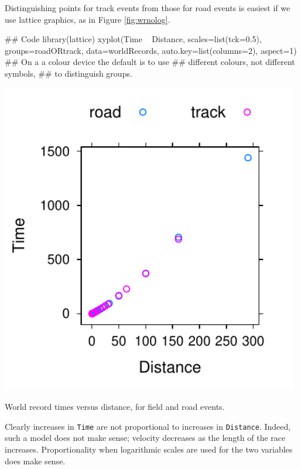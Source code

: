 \documentclass{tufte-book}\usepackage[]{graphicx}\usepackage[]{color}
\newcommand{\txtt}[1]{\texttt{#1}}
\begin{document}
Distinguishing points for track events from those for road events is
easiest if we use lattice graphics, as in Figure \ref{fig:wrnolog}.

\begin{Schunk}
\begin{Sinput}
## Code
library(lattice)
xyplot(Time ~ Distance, scales=list(tck=0.5),
       groups=roadORtrack, data=worldRecords,
       auto.key=list(columns=2), aspect=1)
## On a a colour device the default is to use
## different colours, not different symbols,
## to distinguish groups.
\end{Sinput}
\end{Schunk}

\begin{marginfigure}
\begin{Schunk}


\centerline{\includegraphics[width=0.98\textwidth]{figs/05-trackVSroad-1} }

\end{Schunk}
\caption{World record times versus distance, for field and road
  events.\label{fig:wrnolog}}
\end{marginfigure}

Clearly increases in \txtt{Time} are not proportional to increases in
\txtt{Distance}.  Indeed, such a model does not make sense; velocity
decreases as the length of the race increases.  Proportionality when
logarithmic scales are used for the two variables does make sense.
\end{document}
